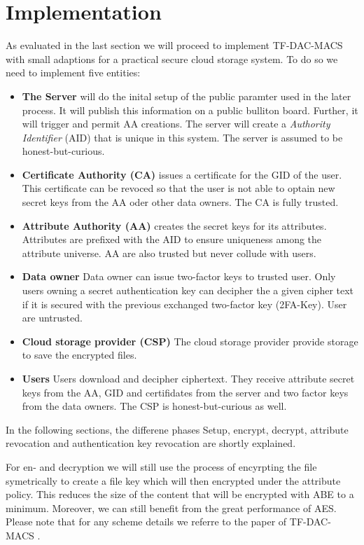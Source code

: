 \section{Implementation}
As evaluated in the last section we will proceed to implement TF-DAC-MACS with small adaptions for a practical secure cloud storage system. To do so we need to implement five entities:  

\begin{itemize}
	\item \textbf{The Server} will do the inital setup of the public paramter used in the later process. It will publish this information on a public bulliton board. Further, it will trigger and permit AA creations. The server will create a \textit{Authority Identifier} (\ac{AID}) that is unique in this system. The server is assumed to be honest-but-curious.
	\item \textbf{Certificate Authority (\ac{CA})} issues a certificate for the GID of the user. This certificate can be revoced so that the user is not able to optain new secret keys from the AA oder other data owners. The CA is fully trusted.
	\item \textbf{Attribute Authority (\ac{AA})} creates the secret keys for its attributes. Attributes are prefixed with the \ac{AID} to ensure uniqueness among the attribute universe. AA are also trusted but never collude with users.
	\item \textbf{Data owner} Data owner can issue two-factor keys to trusted user. Only users owning a secret authentication key can decipher the a given cipher text if it is secured with the previous exchanged two-factor key (\ac{2FA}-Key). User are untrusted.
	\item \textbf{Cloud storage provider (\ac{CSP})} The cloud storage provider provide storage to save the encrypted files.
	\item \textbf{Users} Users download and decipher ciphertext. They receive attribute secret keys from the AA, GID and certifidates from the server and two factor keys from the data owners. The CSP is honest-but-curious as well.
\end{itemize}

In the following sections, the differene phases Setup, encrypt, decrypt, attribute revocation and authentication key revocation are shortly explained.

For en- and decryption we will still use the process of encyrpting the file symetrically to create a file key which will then encrypted under the attribute policy. This reduces the size of the content that will be encrypted with ABE to a minimum. Moreover, we can still benefit from the great performance of \ac{AES}. Please note that for any scheme details we referre to the paper of TF-DAC-MACS \cite{li2017two}.

